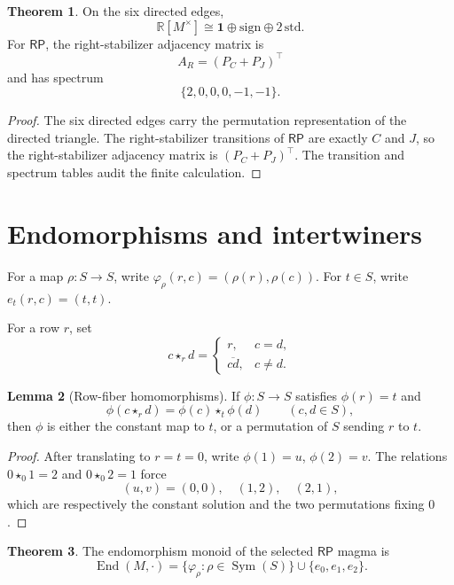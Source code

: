 \documentclass[11pt]{article}
\theoremstyle{definition}
\newtheorem{theorem}{Theorem}[section]
\newtheorem{lemma}[theorem]{Lemma}
\newcommand{\RP}{\mathsf{RP}}
\begin{document}
\begin{theorem}
\label{thm:15.4}
On the six directed edges,
\[
\mathbb R[M^\times]\cong\mathbf1\oplus\mathrm{sign}\oplus2\,\mathrm{std}.
\]
For \(\RP\), the right-stabilizer adjacency matrix is
\[
A_R=(P_C+P_J)^\top
\]
and has spectrum
\[
\{2,0,0,0,-1,-1\}.
\]
\end{theorem}

\begin{proof}
The six directed edges carry the permutation representation of the directed
triangle.  The right-stabilizer transitions of \(\RP\) are exactly \(C\) and
\(J\), so the right-stabilizer adjacency matrix is \((P_C+P_J)^\top\).  The transition and
spectrum tables audit the finite calculation.
\end{proof}

\section{Endomorphisms and intertwiners}\label{endomorphisms-intertwiners}\label{endomorphisms-intertwiners-and-row-sum-contraction}

For a map \(\rho:S\to S\), write
\(\varphi_\rho(r,c)=(\rho(r),\rho(c))\).  For \(t\in S\), write
\(e_t(r,c)=(t,t)\).

For a row \(r\), set
\[
c\star_r d=
\begin{cases}
r, & c=d,\\
\overline{cd}, & c\ne d.
\end{cases}
\]

\begin{lemma}[Row-fiber homomorphisms]
\label{lem:16.1}
If \(\phi:S\to S\) satisfies \(\phi(r)=t\) and
\[
\phi(c\star_r d)=\phi(c)\star_t\phi(d)
\qquad(c,d\in S),
\]
then \(\phi\) is either the constant map to \(t\), or a permutation of
\(S\) sending \(r\) to \(t\).
\end{lemma}

\begin{proof}
After translating to \(r=t=0\), write \(\phi(1)=u\), \(\phi(2)=v\).  The
relations \(0\star_0 1=2\) and \(0\star_0 2=1\) force
\[
(u,v)=(0,0),\quad (1,2),\quad (2,1),
\]
which are respectively the constant solution and the two permutations fixing
\(0\).
\end{proof}

\begin{theorem}
\label{thm:16.2}
The endomorphism monoid of the selected \(\RP\) magma is
\[
\operatorname{End}(M,\cdot)
=
\{\varphi_\rho:\rho\in\operatorname{Sym}(S)\}\cup\{e_0,e_1,e_2\}.
\]
\end{theorem}
\end{document}
